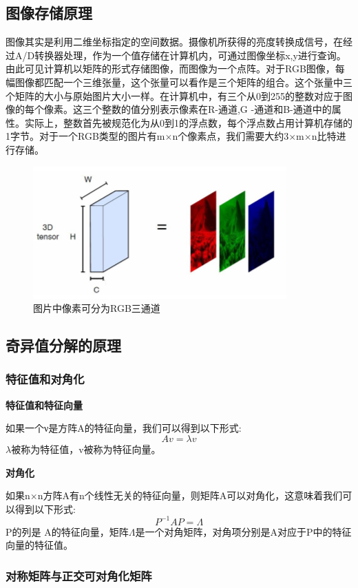 \documentclass{hfutpaper}
\begin{document}
	\subsection{图像存储原理}
	图像其实是利用二维坐标指定的空间数据。摄像机所获得的亮度转换成信号，在经过A/D转换器处理，作为一个值存储在计算机内，可通过图像坐标x,y进行查询。由此可见计算机以矩阵的形式存储图像，而图像为一个点阵。对于RGB图像，每幅图像都匹配一个三维张量，这个张量可以看作是三个矩阵的组合。这个张量中三个矩阵的大小与原始图片大小一样。在计算机中，有三个从0到255的整数对应于图像的每个像素。这三个整数的值分别表示像素在R-通道,G -通道和B-通道中的属性。实际上，整数首先被规范化为从0到1的浮点数，每个浮点数占用计算机存储的1字节。对于一个RGB类型的图片有m$\times$n个像素点，我们需要大约3$\times$m$\times$n比特进行存储。
	\begin{figure}[H]
		\centering
		\includegraphics[scale=0.7]{1}
		\caption{图片中像素可分为RGB三通道}
	\end{figure}
	\subsection{奇异值分解的原理}
	\subsubsection{特征值和对角化}
	\textbf{特征值和特征向量}
	
	如果一个ν是方阵A的特征向量，我们可以得到以下形式:
	$$Av=\lambda v$$
	$\lambda$被称为特征值，v被称为特征向量。
	
	\textbf{对角化}
	
	如果n$\times$n方阵A有n个线性无关的特征向量，则矩阵A可以对角化，这意味着我们可以得到以下形式:
	$$P^{-1}AP=\Lambda$$
	P的列是 A的特征向量，矩阵$\Lambda$是一个对角矩阵，对角项分别是A对应于P中的特征向量的特征值。
	\subsubsection{对称矩阵与正交可对角化矩阵}
	
\end{document}

